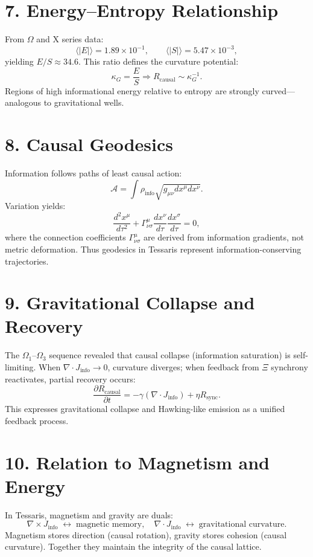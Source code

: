 \documentclass[11pt,a4paper]{article}
\begin{document}
\section{7. Energy--Entropy Relationship}
From $\Omega$ and X series data:
\[
\langle |E| \rangle = 1.89\times10^{-1}, \qquad \langle |S| \rangle = 5.47\times10^{-3},
\]
yielding \(E/S \approx 34.6\).  
This ratio defines the curvature potential:
\[
\kappa_G = \frac{E}{S} \Rightarrow R_{\mathrm{causal}} \sim \kappa_G^{-1}.
\]
Regions of high informational energy relative to entropy are strongly curved---analogous to gravitational wells.

\section{8. Causal Geodesics}
Information follows paths of least causal action:
\[
\mathcal{A} = \int \rho_{\mathrm{info}} \sqrt{g_{\mu\nu} dx^\mu dx^\nu}.
\]
Variation yields:
\[
\frac{d^2 x^\mu}{d\tau^2} + \Gamma^\mu_{\nu\sigma} \frac{dx^\nu}{d\tau}\frac{dx^\sigma}{d\tau} = 0,
\]
where the connection coefficients $\Gamma^\mu_{\nu\sigma}$ are derived from information gradients, not metric deformation.  
Thus geodesics in Tessaris represent information-conserving trajectories.

\section{9. Gravitational Collapse and Recovery}
The $\Omega_1$--$\Omega_3$ sequence revealed that causal collapse (information saturation) is self-limiting.  
When $\nabla\!\cdot\!J_{\mathrm{info}} \to 0$, curvature diverges; when feedback from $\Xi$ synchrony reactivates, partial recovery occurs:
\[
\frac{\partial R_{\mathrm{causal}}}{\partial t} = -\gamma (\nabla\!\cdot\!J_{\mathrm{info}}) + \eta R_{\mathrm{sync}}.
\]
This expresses gravitational collapse and Hawking-like emission as a unified feedback process.

\section{10. Relation to Magnetism and Energy}
In Tessaris, magnetism and gravity are duals:
\[
\nabla\times J_{\mathrm{info}} \;\leftrightarrow\; \text{magnetic memory}, \quad
\nabla\!\cdot\!J_{\mathrm{info}} \;\leftrightarrow\; \text{gravitational curvature}.
\]
Magnetism stores direction (causal rotation), gravity stores cohesion (causal curvature).  
Together they maintain the integrity of the causal lattice.
\end{document}
